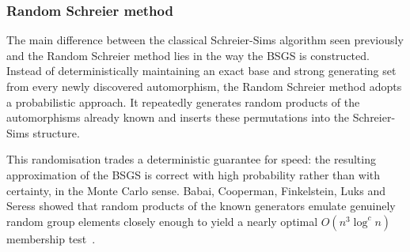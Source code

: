\noindent{}

 \newpage

  \subsubsection{Random Schreier method}

  The main difference between the classical Schreier-Sims algorithm seen previously and the Random Schreier method lies in the way the BSGS is constructed. Instead of deterministically maintaining an exact base and strong generating set from every newly discovered automorphism, the Random Schreier method adopts a probabilistic approach. It repeatedly generates random products of the automorphisms already known and inserts these permutations into the Schreier-Sims structure.
  
  This randomisation trades a deterministic guarantee for speed: the
  resulting approximation of the BSGS is correct with high probability
  rather than with certainty, in the Monte Carlo sense. Babai, Cooperman,
  Finkelstein, Luks and Seress showed that random products of the known
  generators emulate genuinely random group elements closely enough to
  yield a nearly optimal $O(n^3 \log^c n)$ membership
  test~\cite{babai1991fast}.
  
